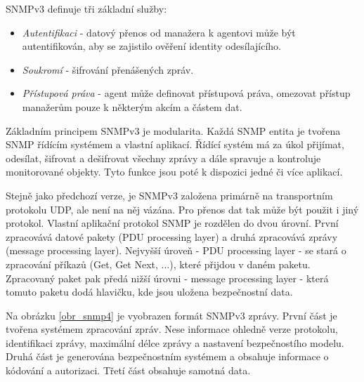 SNMPv3 definuje tři základní služby:
\begin{itemize}
	\item \textit{Autentifikaci} - datový přenos od manažera k agentovi může být autentifikován, aby se zajistilo ověření identity odesílajícího.
	\item \textit{Soukromí} - šifrování přenášených zpráv.
	\item \textit{Přístupová práva} - agent může definovat přístupová práva, omezovat přístup manažerům pouze k některým akcím a částem dat.
\end{itemize}

Základním principem SNMPv3 je modularita. Každá SNMP entita je tvořena SNMP řídícím systémem a vlastní aplikací. Řídící systém má za úkol 
přijímat, odesílat, šifrovat a dešifrovat všechny zprávy a dále spravuje a kontroluje monitorované objekty. Tyto funkce jsou poté k dispozici jedné či více
aplikací.

Stejně jako předchozí verze, je SNMPv3 založena primárně na transportním protokolu UDP, ale není na něj vázána. Pro přenos dat tak může být použit i jiný protokol.
Vlastní aplikační protokol SNMP je rozdělen do dvou úrovní. První zpracovává datové pakety (PDU processing layer) a druhá zpracovává zprávy (message processing layer).
Nejvyšší úroveň - PDU processing layer - se stará o zpracování příkazů (Get, Get Next, ...), které přijdou v daném paketu. Zpracovaný paket pak předá nižší úrovni - 
message processing layer - která tomuto paketu dodá hlavičku, kde jsou uložena bezpečnostní data.

Na obrázku \ref{obr_snmp4} je vyobrazen formát SNMPv3 zprávy. První část je tvořena systémem zpracování zpráv. Nese informace ohledně verze protokolu, identifikaci zprávy,
maximální délce zprávy a nastavení bezpečnostího modelu. Druhá část je generována bezpečnostním systémem a obsahuje informace o kódování a autorizaci. Třetí část obsahuje samotná 
data.

